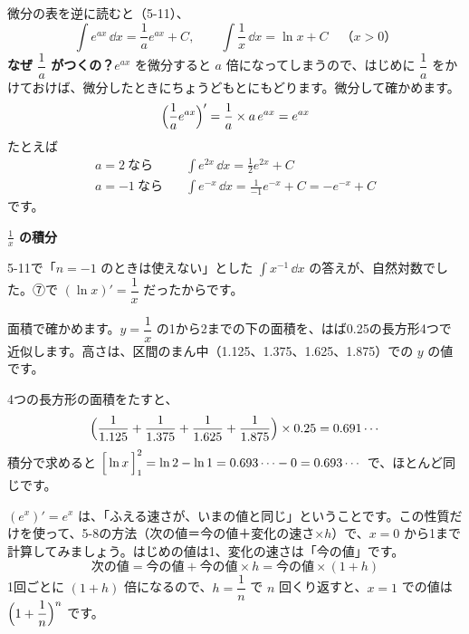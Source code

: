 
\label{bk:5-14:sekibun}微分の表を逆に読むと（5-11）、
\[ \int e^{ax}\,\dd x=\frac{1}{a}e^{ax}+C,\qquad \int\frac{1}{x}\,\dd x=\ln x+C\quad（x>0） \]
\noindent\textbf{なぜ $\dfrac{1}{a}$ がつくの？}\quad $e^{ax}$ を微分すると $a$ 倍になってしまうので、はじめに $\dfrac{1}{a}$ をかけておけば、微分したときにちょうどもとにもどります。微分して確かめます。
\[ \Bigl(\frac{1}{a}e^{ax}\Bigr)'=\frac{1}{a}\times a\,e^{ax}=e^{ax} \]
たとえば
\begin{align*}
a=2\ \text{なら}&\quad \int e^{2x}\,\dd x=\frac{1}{2}e^{2x}+C\\
a=-1\ \text{なら}&\quad \int e^{-x}\,\dd x=\frac{1}{-1}e^{-x}+C=-e^{-x}+C
\end{align*}
です。

\noindent\textbf{$\frac{1}{x}$ の積分}\par
5-11で「$n=-1$ のときは使えない」とした $\displaystyle\int x^{-1}\,\dd x$ の答えが、自然対数でした。⑦で $(\ln x)'=\dfrac{1}{x}$ だったからです。

\noindent\begin{minipage}[c]{0.44\linewidth}
\end{minipage}\hfill
\begin{minipage}[c]{0.52\linewidth}\raggedright
面積で確かめます。$y=\dfrac{1}{x}$ の1から2までの下の面積を、はば0.25の長方形4つで近似します。高さは、区間のまん中（1.125、1.375、1.625、1.875）での $y$ の値です。
\end{minipage}

\noindent 4つの長方形の面積をたすと、
\[ \Bigl(\frac{1}{1.125}+\frac{1}{1.375}+\frac{1}{1.625}+\frac{1}{1.875}\Bigr)\times0.25=0.691\cdots \]
積分で求めると $\Bigl[\,\ln x\,\Bigr]_1^2=\ln2-\ln1=0.693\cdots-0=0.693\cdots$ で、ほとんど同じです。


\label{bk:5-14:euler}$(e^x)'=e^x$ は、「ふえる速さが、いまの値と同じ」ということです。この性質だけを使って、5-8の方法（次の値＝今の値＋変化の速さ×$h$）で、$x=0$ から1まで計算してみましょう。はじめの値は1、変化の速さは「今の値」です。
\[ \text{次の値}=\text{今の値}+\text{今の値}\times h=\text{今の値}\times(1+h) \]
1回ごとに $(1+h)$ 倍になるので、$h=\dfrac{1}{n}$ で $n$ 回くり返すと、$x=1$ での値は $\Bigl(1+\dfrac{1}{n}\Bigr)^n$ です。

